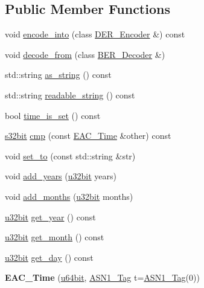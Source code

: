 \subsection*{Public Member Functions}
\begin{DoxyCompactItemize}
\item 
void \hyperlink{classBotan_1_1EAC__Time_a7cd58eeb66f2fdef3b429fe15842c73f}{encode\-\_\-into} (class \hyperlink{classBotan_1_1DER__Encoder}{D\-E\-R\-\_\-\-Encoder} \&) const 
\item 
void \hyperlink{classBotan_1_1EAC__Time_a30bb552655124e0ea4cb686ff217ddaf}{decode\-\_\-from} (class \hyperlink{classBotan_1_1BER__Decoder}{B\-E\-R\-\_\-\-Decoder} \&)
\item 
std\-::string \hyperlink{classBotan_1_1EAC__Time_a69f7d98a5d91cfcc6ebff7d4ab6225a1}{as\-\_\-string} () const 
\item 
std\-::string \hyperlink{classBotan_1_1EAC__Time_a7a22e2c139c4da6ab43bbc9d83f4d4e1}{readable\-\_\-string} () const 
\item 
bool \hyperlink{classBotan_1_1EAC__Time_a2b9f75ab2098b2cec2095e6530b30321}{time\-\_\-is\-\_\-set} () const 
\item 
\hyperlink{namespaceBotan_a28e03d327abd4d5b1e7091e8d80d5cfe}{s32bit} \hyperlink{classBotan_1_1EAC__Time_a8c6ba657a584d3f0126e98762207b13d}{cmp} (const \hyperlink{classBotan_1_1EAC__Time}{E\-A\-C\-\_\-\-Time} \&other) const 
\item 
void \hyperlink{classBotan_1_1EAC__Time_aa8fbe08464e9824d632b5fe6d7712b4b}{set\-\_\-to} (const std\-::string \&str)
\item 
void \hyperlink{classBotan_1_1EAC__Time_a2b205471ece36cf2d66f190fa88ae10d}{add\-\_\-years} (\hyperlink{namespaceBotan_aacc7d03c95e97e76168fc1c819031830}{u32bit} years)
\item 
void \hyperlink{classBotan_1_1EAC__Time_aefca5dc1f31fd3bff472b6f494768ac0}{add\-\_\-months} (\hyperlink{namespaceBotan_aacc7d03c95e97e76168fc1c819031830}{u32bit} months)
\item 
\hyperlink{namespaceBotan_aacc7d03c95e97e76168fc1c819031830}{u32bit} \hyperlink{classBotan_1_1EAC__Time_a61e53be23db688755f02e19f71b0f5a6}{get\-\_\-year} () const 
\item 
\hyperlink{namespaceBotan_aacc7d03c95e97e76168fc1c819031830}{u32bit} \hyperlink{classBotan_1_1EAC__Time_af6a0f05565b35498e2044ba1a87634cc}{get\-\_\-month} () const 
\item 
\hyperlink{namespaceBotan_aacc7d03c95e97e76168fc1c819031830}{u32bit} \hyperlink{classBotan_1_1EAC__Time_a3575836a37a435ddf1c8233bbe685a9c}{get\-\_\-day} () const 
\item 
\hypertarget{classBotan_1_1EAC__Time_a545b5c5c73db0938963da6a8bb36d11e}{{\bfseries E\-A\-C\-\_\-\-Time} (\hyperlink{namespaceBotan_a634063d9fb05e25262ca94ed927030f6}{u64bit}, \hyperlink{namespaceBotan_aaa08f67a945ef195fa39e62659dffa7a}{A\-S\-N1\-\_\-\-Tag} t=\hyperlink{namespaceBotan_aaa08f67a945ef195fa39e62659dffa7a}{A\-S\-N1\-\_\-\-Tag}(0))}\label{classBotan_1_1EAC__Time_a545b5c5c73db0938963da6a8bb36d11e}


\end{DoxyCompactItemize}
